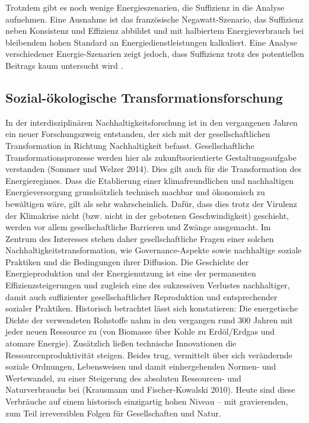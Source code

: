 \documentclass[a4paper,11pt,twoside]{scrartcl}
\begin{document}
Trotzdem gibt es noch wenige Energieszenarien, die Suffizienz in die Analyse aufnehmen. Eine Ausnahme ist das französische Negawatt-Szenario, das Suffizienz neben Konsistenz und Effizienz abbildet \cite{negawatt2017} und mit halbiertem Energieverbrauch bei bleibendem hohen Standard an Energiedienstleistungen kalkuliert. Eine Analyse verschiedener Energie-Szenarien zeigt jedoch, dass Suffizienz trotz des potentiellen Beitrags kaum untersucht wird \cite{SAMADI2017}.


\subsection*{Sozial-ökologische Transformationsforschung}
In der interdisziplinären Nachhaltigkeitsforschung ist in den vergangenen Jahren ein neuer Forschungszweig entstanden, der sich mit der gesellschaftlichen Transformation in Richtung Nachhaltigkeit befasst. Gesellschaftliche Transformationsprozesse werden hier als zukunftsorientierte Gestaltungsaufgabe verstanden (Sommer und Welzer 2014). Dies gilt auch für die Transformation des Energieregimes. Dass die Etablierung einer klimafreundlichen und nachhaltigen Energieversorgung grundsätzlich technisch machbar und ökonomisch zu bewältigen wäre, gilt als sehr wahrscheinlich. Dafür, dass dies trotz der Virulenz der Klimakrise nicht (bzw. nicht in der gebotenen Geschwindigkeit) geschieht, werden vor allem gesellschaftliche Barrieren und Zwänge ausgemacht. Im Zentrum des Interesses stehen daher gesellschaftliche Fragen einer solchen Nachhaltigkeitstransformation, wie Governance-Aspekte sowie nachhaltige soziale Praktiken und die Bedingungen ihrer Diffusion.
Die Geschichte der Energieproduktion und der Energienutzung ist eine der permanenten Effizienzsteigerungen und zugleich eine des sukzessiven Verlustes nachhaltiger, damit auch suffizienter gesellschaftlicher Reproduktion und entsprechender sozialer Praktiken. Historisch betrachtet lässt sich konstatieren: Die energetische Dichte der verwendeten Rohstoffe nahm in den vergangen rund 300 Jahren mit jeder neuen Ressource zu (von Biomasse über Kohle zu Erdöl/Erdgas und atomare Energie). Zusätzlich ließen technische Innovationen die Ressourcenproduktivität steigen. Beides trug, vermittelt über sich verändernde soziale Ordnungen, Lebensweisen und damit einhergehenden Normen- und Wertewandel, zu einer Steigerung des absoluten Ressourcen- und Naturverbrauchs bei (Krausmann und Fischer-Kowalski 2010). Heute sind diese Verbräuche auf einem historisch einzigartig hohen Niveau – mit gravierenden, zum Teil irreversiblen Folgen für Gesellschaften und Natur.
\end{document}
